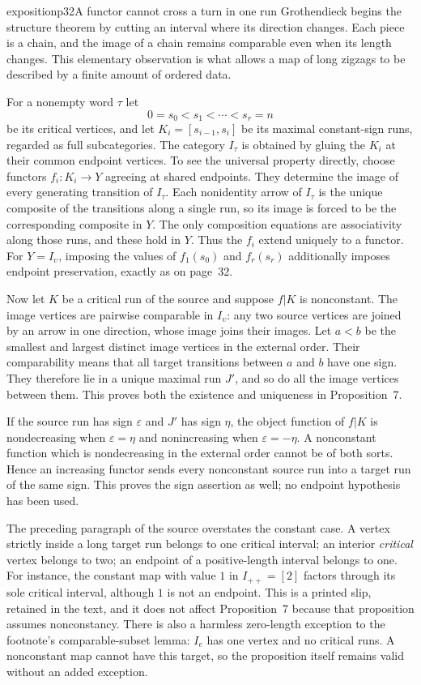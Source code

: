 \begin{dcomment}{exposition}{p32}{A functor cannot cross a turn in one run}
Grothendieck begins the structure theorem by cutting an interval where its direction changes. Each piece is a chain, and the image of a chain remains comparable even when its length changes. This elementary observation is what allows a map of long zigzags to be described by a finite amount of ordered data.

For a nonempty word $\tau$ let
\[
 0=s_0<s_1<\cdots<s_r=n
\]
be its critical vertices, and let $K_i=[s_{i-1},s_i]$ be its maximal constant-sign runs, regarded as full subcategories. The category $I_\tau$ is obtained by gluing the $K_i$ at their common endpoint vertices. To see the universal property directly, choose functors $f_i:K_i\to Y$ agreeing at shared endpoints. They determine the image of every generating transition of $I_\tau$. Each nonidentity arrow of $I_\tau$ is the unique composite of the transitions along a single run, so its image is forced to be the corresponding composite in $Y$. The only composition equations are associativity along those runs, and these hold in $Y$. Thus the $f_i$ extend uniquely to a functor. For $Y=I_{\upsilon}$, imposing the values of $f_1(s_0)$ and $f_r(s_r)$ additionally imposes endpoint preservation, exactly as on page~32.

Now let $K$ be a critical run of the source and suppose $f|K$ is nonconstant. The image vertices are pairwise comparable in $I_{\upsilon}$: any two source vertices are joined by an arrow in one direction, whose image joins their images. Let $a<b$ be the smallest and largest distinct image vertices in the external order. Their comparability means that all target transitions between $a$ and $b$ have one sign. They therefore lie in a unique maximal run $J'$, and so do all the image vertices between them. This proves both the existence and uniqueness in Proposition~7.

If the source run has sign $\varepsilon$ and $J'$ has sign $\eta$, the object function of $f|K$ is nondecreasing when $\varepsilon=\eta$ and nonincreasing when $\varepsilon=-\eta$. A nonconstant function which is nondecreasing in the external order cannot be of both sorts. Hence an increasing functor sends every nonconstant source run into a target run of the same sign. This proves the sign assertion as well; no endpoint hypothesis has been used.

The preceding paragraph of the source overstates the constant case. A vertex strictly inside a long target run belongs to one critical interval; an interior \emph{critical} vertex belongs to two; an endpoint of a positive-length interval belongs to one. For instance, the constant map with value $1$ in $I_{++}=[2]$ factors through its sole critical interval, although $1$ is not an endpoint. This is a printed slip, retained in the text, and it does not affect Proposition~7 because that proposition assumes nonconstancy. There is also a harmless zero-length exception to the footnote's comparable-subset lemma: $I_e$ has one vertex and no critical runs. A nonconstant map cannot have this target, so the proposition itself remains valid without an added exception.
\end{dcomment}

